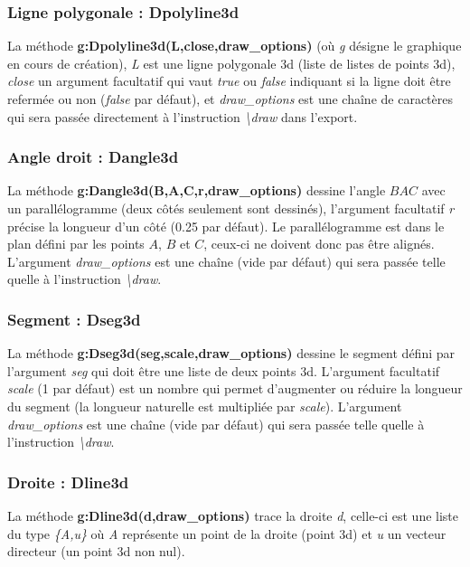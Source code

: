 \documentclass[%
10pt,%
a4paper,%
french,%
]%
{article}%
\begin{document}
\subsubsection{Ligne polygonale : Dpolyline3d}

La méthode \textbf{g:Dpolyline3d(L,close,draw\_options)} (où \emph{g} désigne le graphique en cours de création), \emph{L} est une ligne polygonale 3d (liste de listes de points 3d), \emph{close} un argument facultatif qui vaut \emph{true} ou \emph{false} indiquant si la ligne doit être refermée ou non (\emph{false} par défaut), et \emph{draw\_options} est une chaîne de caractères qui sera passée directement à l'instruction \emph{\textbackslash draw} dans l'export.
    
\subsubsection{Angle droit : Dangle3d}

La méthode \textbf{g:Dangle3d(B,A,C,r,draw\_options)} dessine l'angle \(BAC\) avec un parallélogramme (deux côtés seulement sont dessinés), l'argument facultatif \emph{r} précise la longueur d'un côté (0.25 par défaut). Le parallélogramme est dans le plan défini par les points $A$, $B$ et $C$, ceux-ci ne doivent donc pas être alignés. L'argument \emph{draw\_options} est une chaîne (vide par défaut) qui sera passée telle quelle à l'instruction  \emph{\textbackslash draw}.
    
\subsubsection{Segment : Dseg3d}

La méthode \textbf{g:Dseg3d(seg,scale,draw\_options)} dessine le segment défini par l'argument \emph{seg} qui doit être une liste de deux points 3d. L'argument facultatif \emph{scale} (1 par défaut) est un nombre qui permet d'augmenter ou réduire la longueur du segment (la longueur naturelle est multipliée par \emph{scale}). L'argument \emph{draw\_options} est une chaîne (vide par défaut) qui sera passée telle quelle à l'instruction \emph{\textbackslash draw}.
    
\subsubsection{Droite : Dline3d}

La méthode \textbf{g:Dline3d(d,draw\_options)} trace la droite \emph{d}, celle-ci est une liste du type \emph{\{A,u\}} où \emph{A} représente un point de la droite (point 3d) et \emph{u} un vecteur directeur (un point 3d non nul). 
\end{document}

